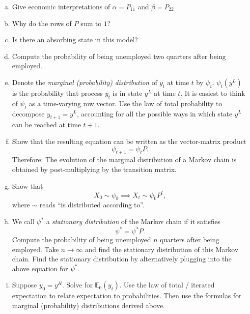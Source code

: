 \documentclass[11pt]{extarticle}
\theoremstyle{plain}
\theoremstyle{definition}
\begin{document}
\begin{enumerate}[(a)]
\item Give economic interpretations of $\alpha = P_{11}$ and $\beta = P_{22}$

\item Why do the rows of $P$ sum to $1$?

\item Is there an absorbing state in this model?

\item Compute the probability of being unemployed two quarters after being employed. 

\item Denote the \textit{marginal (probability) distribution} of $y_t$ at time $t$ by $\psi_t$. $\psi_t(y^L)$ is the probability that process $y_t$ is in state $y^L$ at time $t$. It is easiest to think of $\psi_t$ as a time-varying row vector. Use the law of total probability to decompose $y_{t+1} = y^L$, accounting for all the possible ways in which state $y^L$ can be reached at time $t+1$. 

\item Show that the resulting equation can be written as the vector-matrix product
\begin{equation*}
	\psi_{t+1} = \psi_t P.
\end{equation*}
Therefore: The evolution of the marginal distribution of a Markov chain is obtained by post-multiplying by the transition matrix. 

\item Show that
\begin{equation*}
	X_0 \sim \psi_0 \implies X_t \sim \psi_0 P^t,
\end{equation*}
where $\sim$ reads ``is distributed according to''. 

\item We call $\psi^*$ a \textit{stationary distribution} of the Markov chain if it satisfies 
\begin{equation*}
	\psi^* = \psi^* P.
\end{equation*}
Compute the probability of being unemployed $n$ quarters after being employed. Take $n \to \infty$ and find the stationary distribution of this Markov chain. Find the stationary distribution by alternatively plugging into the above equation for $\psi^*$. 

\item Suppose $y_0 = y^H$. Solve for $\mathbb E_0 (y_t)$. Use the law of total / iterated expectation to relate expectation to probabilities. Then use the formulas for marginal (probability) distributions derived above. 
\end{enumerate}
\end{document}

